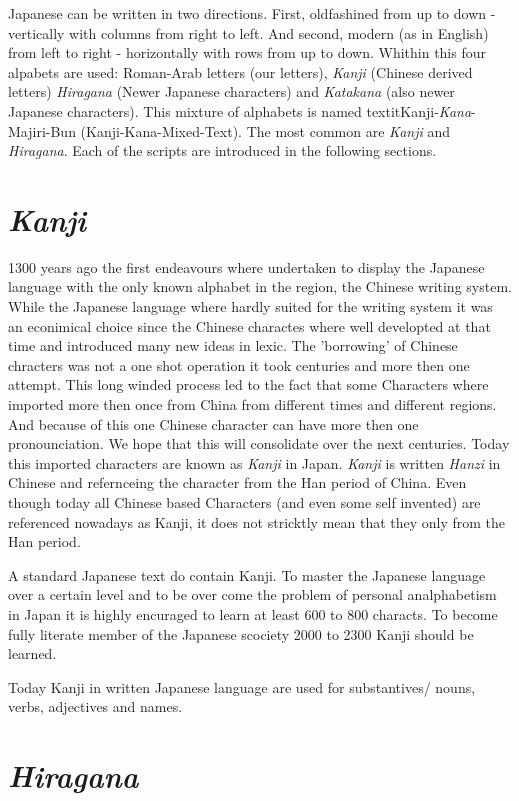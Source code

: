 Japanese can be written in two directions. First, oldfashined from up to down -
vertically with columns from right to left. And second, modern (as in English)
from left to right - horizontally with rows from up to down. Whithin this four
alpabets are used: Roman-Arab letters (our letters), \textit{Kanji} (Chinese
derived letters)  \textit{Hiragana} (Newer Japanese characters) and
\textit{Katakana} (also newer Japanese characters).  This mixture of alphabets
is named textit{Kanji}-\textit{Kana}-Majiri-Bun (Kanji-Kana-Mixed-Text). The
most common are \textit{Kanji} and \textit{Hiragana}. Each of the scripts are
introduced in the following sections.

\section*{\textit{Kanji}} 

1300 years ago the first endeavours where undertaken to display the Japanese
language with the only known alphabet in the region, the Chinese writing
system. While the Japanese language where hardly suited for the writing system
it was an  econimical choice since the Chinese charactes where well developted
at that time and introduced many new ideas in lexic. The 'borrowing' of Chinese
chracters was not a one shot operation it took centuries and more then one
attempt. This long winded process led to the fact that some Characters where
imported more then once from China from different times and different regions.
And because of this one Chinese character can have more then one
pronounciation. We hope that this will consolidate over the next centuries.
Today this imported characters are known as \textit{Kanji} in Japan.
\textit{Kanji} is written \textit{Hanzi} in Chinese and refernceing the
character from the Han period of China. Even though today all Chinese based
Characters (and even some self invented) are referenced nowadays as Kanji,
it does not stricktly mean that they only from the Han period.

A standard Japanese text do contain Kanji. To master the Japanese language
over a certain level and to be over come the problem of personal analphabetism
in Japan it is highly encuraged to learn at least 600 to 800 characts. To
 become fully literate member of the Japanese scociety 2000 to 2300 Kanji
 should be learned. 

Today  Kanji in written Japanese language are used for substantives/ nouns,
verbs, adjectives and names. 

\section*{\textit{Hiragana}}

